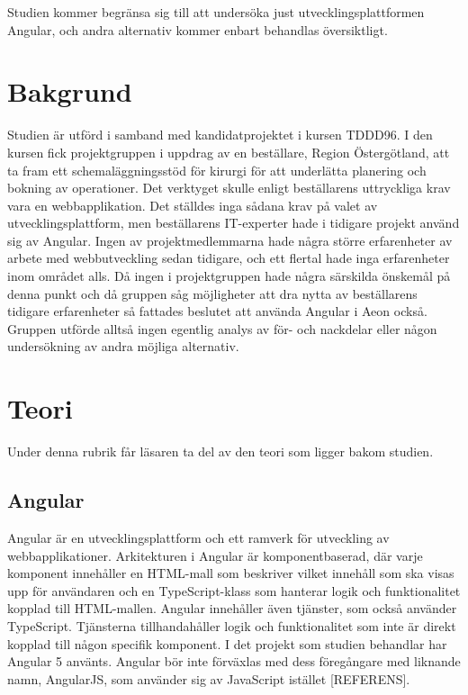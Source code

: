 Studien kommer begränsa sig till att undersöka just utvecklingsplattformen Angular, och andra alternativ kommer enbart behandlas översiktligt.

\section{Bakgrund}


Studien är utförd i samband med kandidatprojektet i kursen TDDD96. I den kursen fick projektgruppen i uppdrag av en beställare, Region Östergötland, att ta fram ett schemaläggningsstöd för kirurgi för att underlätta planering och bokning av operationer. Det verktyget skulle enligt beställarens uttryckliga krav vara en webbapplikation. Det ställdes inga sådana krav på valet av utvecklingsplattform, men beställarens IT-experter hade i tidigare projekt använd sig av Angular. Ingen av projektmedlemmarna hade några större erfarenheter av arbete med webbutveckling sedan tidigare, och ett flertal hade inga erfarenheter inom området alls. Då ingen i projektgruppen hade några särskilda önskemål på denna punkt och då gruppen såg möjligheter att dra nytta av beställarens tidigare erfarenheter så fattades beslutet att använda Angular i Aeon också. Gruppen utförde alltså ingen egentlig analys av för- och nackdelar eller någon undersökning av andra möjliga alternativ.  

\section{Teori}

Under denna rubrik får läsaren ta del av den teori som ligger bakom studien.

\subsection{Angular}

Angular är en utvecklingsplattform och ett ramverk för utveckling av webbapplikationer. Arkitekturen i Angular är komponentbaserad, där varje komponent innehåller en HTML-mall som beskriver vilket innehåll som ska visas upp för användaren och en TypeScript-klass som hanterar logik och funktionalitet kopplad till HTML-mallen. Angular innehåller även tjänster, som också använder TypeScript. Tjänsterna tillhandahåller logik och funktionalitet som inte är direkt kopplad till någon specifik komponent.  I det projekt som studien behandlar har Angular 5 använts. Angular bör inte förväxlas med dess föregångare med liknande namn, AngularJS, som använder sig av JavaScript istället [REFERENS].

